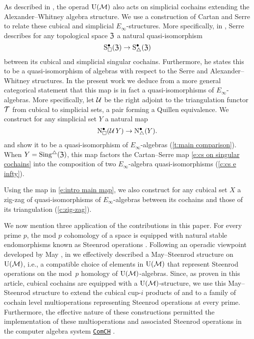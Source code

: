 As described in \cite{medina2020prop1}, the operad ${\operatorname{U}(\mathcal{M})}$ also acts on simplicial cochains extending the Alexander--Whitney algebra structure.
We use a construction of Cartan and Serre to relate these cubical and simplicial $E_\infty$-structures.
More specifically, in \cite[p. 442]{serre1951homologie}, Serre describes for any topological space $\mathfrak{Z}$ a natural quasi-isomorphism
\begin{equation} \label{e:cs on singular cochains}
	\operatorname{S^{\bullet}_{\square}}(\mathfrak{Z}) \to \operatorname{S^{\bullet}_{\triangle}}(\mathfrak{Z})
\end{equation}
between its cubical and simplicial singular cochains.
Furthermore, he states this to be a quasi-isomorphism of algebras with respect to the Serre and Alexander--Whitney structures.
In the present work we deduce from a more general categorical statement that this map is in fact a quasi-isomorphisms of $E_\infty$-algebras.
More specifically, let $\operatorname{\mathcal{U}}$ be the right adjoint to the triangulation functor $\operatorname{\mathcal{T}}$ from cubical to simplicial sets, a pair forming a Quillen equivalence.
We construct for any simplicial set $Y$ a natural map
\begin{equation} \label{e:intro main map}
	\operatorname{N^{\bullet}_{\square}}(\operatorname{\mathcal{U}} Y) \to \operatorname{N^{\bullet}_{\triangle}}(Y).
\end{equation}
and show it to be a quasi-isomorphism of $E_\infty$-algebras (\cref{t:main comparison}).
When $Y = \operatorname{Sing^{\triangle}}(\mathfrak{Z})$, this map factors the Cartan--Serre map \eqref{e:cs on singular cochains} into the composition of two $E_\infty$-algebra quasi-isomorphisms (\cref{c:cs e infty}).

Using the map in \cref{e:intro main map}, we also construct for any cubical set $X$ a zig-zag of quasi-isomorphisms of $E_\infty$-algebras between its cochains and those of its triangulation (\cref{c:zig-zag}).

We now mention three application of the contributions in this paper.
For every prime $p$, the mod $p$ cohomology of a space is equipped with natural stable endomorphisms known as Steenrod operations \cite{steenrod1962cohomology}.
Following an operadic viewpoint developed by May \cite{may1970general}, in \cite{medina2021may_st} we effectively described a May--Steenrod structure on ${\operatorname{U}(\mathcal{M})}$, i.e., a compatible choice of elements in ${\operatorname{U}(\mathcal{M})}$ that represent Steenrod operations on the mod~$p$ homology of ${\operatorname{U}(\mathcal{M})}$-algebras.
Since, as proven in this article, cubical cochains are equipped with a ${\operatorname{U}(\mathcal{M})}$-structure, we use this May--Steenrod structure to extend the cubical cup-$i$ products of \cite{kadeishvili1999coproducts} and \cite{pilarczyk2016cubical} to a family of cochain level multioperations representing Steenrod operations at every prime.
Furthermore, the effective nature of these constructions permitted the implementation of these multioperations and associated Steenrod operations in the computer algebra system \href{https://comch.readthedocs.io/en/latest/}{\texttt{ComCH}} \cite{medina2021comch}.

